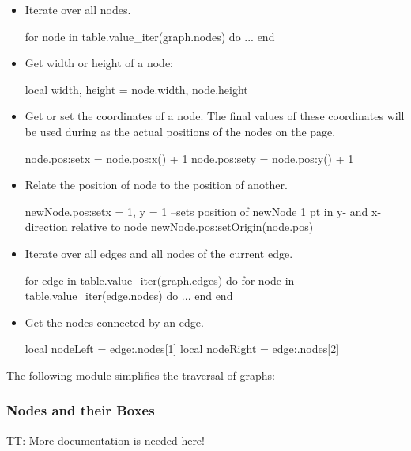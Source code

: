 \begin{itemize}
\item Iterate over all nodes.
\begin{codeexample}
for node in table.value_iter(graph.nodes) do
   ...
end
\end{codeexample}
\item Get width or height of a node:
\begin{codeexample}
local width, height = node.width, node.height
\end{codeexample}
\item Get or set the coordinates of a node. The final values of these
  coordinates will be used during as the actual positions of the nodes
  on the page.
\begin{codeexample}
node.pos:set{x = node.pos:x() + 1}
node.pos:set{y = node.pos:y() + 1}
\end{codeexample}
\item Relate the position of node to the position of another.
\begin{codeexample}
newNode.pos:set{x = 1, y = 1}
--sets position of newNode 1 pt in y- and x-direction relative to node
newNode.pos:setOrigin(node.pos)
\end{codeexample}
\item Iterate over all edges and all nodes of the current edge.
\begin{codeexample}
for edge in table.value_iter(graph.edges) do
   for node in table.value_iter(edge.nodes) do
      ...
   end
end
\end{codeexample}
\item Get the nodes connected by an edge.
\begin{codeexample}
local nodeLeft = edge:.nodes[1]
local nodeRight = edge:.nodes[2]
\end{codeexample}
\end{itemize}



The following module simplifies the traversal of graphs:




\subsubsection{Nodes and their Boxes}

TT: More documentation is needed here!

